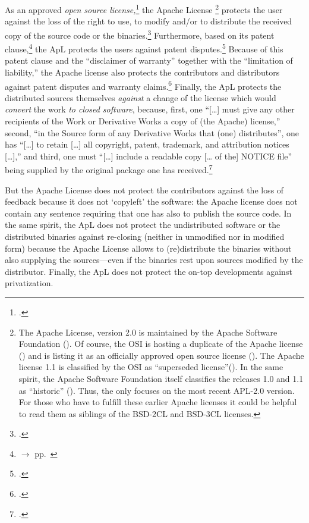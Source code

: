 As an approved \emph{open source license,}\footcite[cf.][\nopage wp]{OSI2012b}
the Apache License%
  \footnote{The Apache License, version 2.0 is maintained by the
  Apache Software Foundation (\cite[cf.][\nopage wp]{AsfApacheLicense20a}).  Of
  course, the OSI is hosting a duplicate of the Apache license
  (\cite[cf.][\nopage wp]{Apl20OsiLicense2004a}) and is listing it as an
  officially approved open source license (\cite[cf.][\nopage wp]{OSI2012b}). The
  Apache license 1.1 is classified by the OSI as \enquote{superseded
  license}(\cite[cf.][\nopage wp]{OSI2013b}). In the same spirit, the Apache
  Software Foundation itself classifies the releases 1.0 and 1.1 as
  \enquote{historic} (\cite[cf.][\nopage wp]{AsfLicenses2013a}). Thus, the \oslic{}
  only focuses on the most recent APL-2.0 version. For those who have to fulfill
  these earlier Apache licenses it could be helpful to read them as siblings of
  the BSD-2CL and BSD-3CL licenses.}
protects the user against the loss of the
right to use, to modify and/or to distribute the received copy of the source
code or the binaries.\footcite[cf.][\nopage wp. §2]{Apl20OsiLicense2004a}
Furthermore, based on its patent clause,\footnote{$\rightarrow$ \oslic{} pp.\
} the ApL protects the users against patent
disputes.\footcite[cf.][\nopage wp. §3]{Apl20OsiLicense2004a} Because of this
patent clause and the \enquote{disclaimer of warranty} together with the
\enquote{limitation of liability,} the Apache license also protects the
contributors and distributors against patent disputes and warranty
claims.\footcite[cf.][\nopage wp. §3, §7, §8]{Apl20OsiLicense2004a} Finally, the
ApL protects the distributed sources themselves \emph{against} a change of the
license which would \emph{convert} the work \emph{to closed software}, because,
first, one \enquote{[\ldots] must give any other recipients of the Work or
Derivative Works a copy of (the Apache) license,} second, \enquote{in the Source
form of any Derivative Works that (one) distributes}, one has \enquote{[\ldots]
to retain [\ldots] all copyright, patent, trademark, and attribution notices
[\ldots],} and third, one must \enquote{[\ldots] include a readable copy [\ldots
of the] NOTICE file} being supplied by the original package one has
received.\footcite[cf.][\nopage wp. §4]{Apl20OsiLicense2004a}

But the Apache License does not protect the contributors against the loss of
feedback because it does not `copyleft' the software: the Apache license does
not contain any sentence requiring that one has also to publish the source code.
In the same spirit, the ApL does not protect the undistributed software or the
distributed binaries against re-closing (neither in unmodified nor in
modified form) because the Apache License allows to (re)distribute the
binaries without also supplying the sources---even if the binaries rest upon
sources modified by the distributor. Finally, the ApL does not protect the
on-top developments against privatization.


